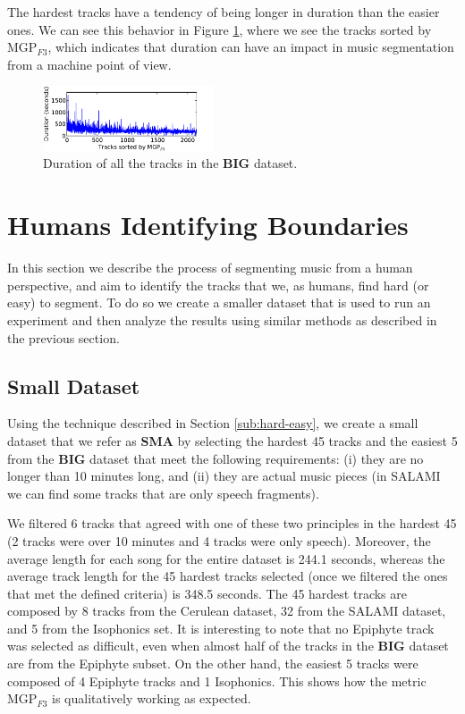 \documentclass{article}
\begin{document}
The hardest tracks have a tendency of being longer in duration than the easier ones.
We can see this behavior in Figure \ref{fig:machinesdur}, where we see the tracks sorted by MGP$_{F3}$, which indicates that duration can have an impact in music segmentation from a machine point of view.

\begin{figure}
  \centering
  \includegraphics[width=0.45\textwidth, height=0.13\textheight]{plots/machines-duration.pdf}
  \caption{Duration of all the tracks in the \textbf{BIG} dataset.}
  \label{fig:machinesdur}
\end{figure}%


\section{Humans Identifying Boundaries}\label{sec:using_method}

In this section we describe the process of segmenting music from a human perspective, and aim to identify the tracks that we, as humans, find hard (or easy) to segment. 
To do so we create a smaller dataset that is used to run an experiment and then analyze the results using similar methods as described in the previous section.

\subsection{Small Dataset}

Using the technique described in Section \ref{sub:hard-easy}, we create a small dataset that we refer as \textbf{SMA} by selecting the hardest 45 tracks and the easiest 5 from the \textbf{BIG} dataset that meet the following requirements: (i) they are no longer than 10 minutes long, and (ii) they are actual music pieces (in SALAMI we can find some tracks that are only speech fragments).

We filtered 6 tracks that agreed with one of these two principles in the hardest 45 (2 tracks were over 10 minutes and 4 tracks were only speech). 
Moreover, the average length for each song for the entire dataset is 244.1 seconds, whereas the average track length for the 45 hardest tracks selected (once we filtered the ones that met the defined criteria) is 348.5 seconds.
The 45 hardest tracks are composed by 8 tracks from the Cerulean dataset, 32 from the SALAMI dataset, and 5 from the Isophonics set.
It is interesting to note that no Epiphyte track was selected as difficult, even when almost half of the tracks in the \textbf{BIG} dataset are from the Epiphyte subset.
On the other hand, the easiest 5 tracks were composed of 4 Epiphyte tracks and 1 Isophonics.
This shows how the metric MGP$_{F3}$ is qualitatively working as expected.
\end{document}
